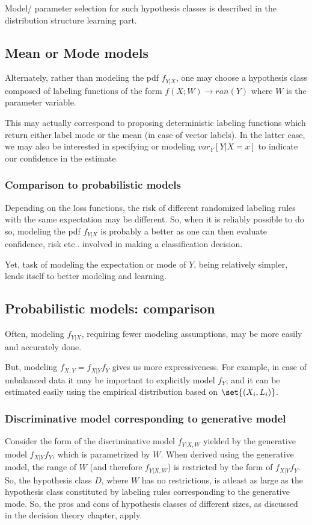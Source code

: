 \documentclass[oneside, article]{memoir}
\begin{document}
Model/ parameter selection for such hypothesis classes is described in the distribution structure learning part.

\subsection{Mean or Mode models}
Alternately, rather than modeling the pdf $f_{Y|X}$, one may choose a hypothesis class composed of labeling functions of the form $f(X; W) \to ran(Y)$ where $W$ is the parameter variable.

This may actually correspond to proposing deterministic labeling functions which return either label mode or the mean (in case of vector labels). In the latter case, we may also be interested in specifying or modeling $var_{Y}[Y|X=x]$ to indicate our confidence in the estimate.

\subsubsection{Comparison to probabilistic models}
Depending on the loss functions, the risk of different randomized labeling rules with the same expectation may be different. So, when it is reliably possible to do so, modeling the pdf $f_{Y|X}$ is probably a better as one can then evaluate confidence, risk etc.. involved in making a classification decision.

Yet, task of modeling the expectation or mode of $Y$, being relatively simpler, lends itself to better modeling and learning.

\subsection{Probabilistic models: comparison}
Often, modeling $f_{Y|X}$, requiring fewer modeling assumptions, may be more easily and accurately done.

But, modeling $f_{X,Y} = f_{X|Y}f_Y$ gives us more expressiveness. For example, in case of unbalanced data it may be important to explicitly model $f_Y$; and it can be estimated easily using the empirical distribution based on $\set{(X_{i}, L_{i})}$.

\subsubsection{Discriminative model corresponding to generative model}
Consider the form of the discriminative model $f_{Y|X, W}$ yielded by the generative model $f_{X|Y} f_Y$, which is parametrized by $W$. When derived using the generative model, the range of $W$ (and therefore $f_{Y|X, W}$) is restricted by the form of $f_{X|Y} f_Y$. So, the hypothesis class $D$, where $W$ has no restrictions, is atleast as large as the hypothesis class constituted by labeling rules corresponding to the generative mode. So, the pros and cons of hypothesis classes of different sizes, as discussed in the decision theory chapter, apply.
\end{document}
